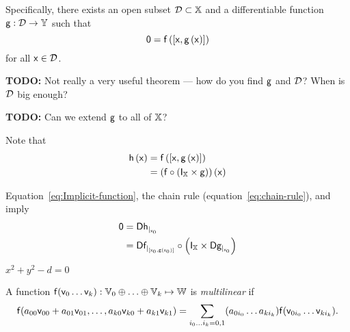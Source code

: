Specifically, 
there exists an open subset $\mathcal{D}  \subset \mathbb{X}$
and a differentiable function $\mathsf{g} : \mathcal{D} \rightarrow \mathbb{Y}$
such that 
\begin{equation}\label{eq:Implicit-function}
\mathsf{0} = \mathsf{f}\left( \left[ \mathsf{x} , \mathsf{g} \left( \mathsf{x} \right) \right] \right)
\end{equation}
for all 
$\mathsf{x} \in  \mathcal{D}$.

\textbf{TODO:} Not really a very useful theorem --- 
how do you find $\mathsf{g}$ and $\mathcal{D}$?
When is $\mathcal{D}$ big enough?

\textbf{TODO:} Can we extend $\mathsf{g}$ to all of $\mathbb{X}$?

Note that 
\begin{equation}\label{eq:Implicit-derivative}
\begin{aligned}
\mathsf{h}\left(\mathsf{x}\right) 
& = 
\mathsf{f}\left( \left[ \mathsf{x} , \mathsf{g} \left( \mathsf{x} \right) \right] \right)
\\
& =
\left( \mathsf{f} \circ \left( \mathsf{I}_{\mathbb{X}} \times \mathsf{g} \right) \right) 
\left( \mathsf{x} \right)
\end{aligned} 
\end{equation}

Equation~\ref{eq:Implicit-function}, the chain rule 
(equation~\ref{eq:chain-rule}),
and
 imply
\begin{equation}\label{eq:Implicit-derivative}
\begin{aligned}
\mathsf{0} & = {\mathsf{D}{\mathsf{h}}_{\mid_{\mathsf{x}_0}}}
\\
& = {\mathsf{D}{\mathsf{f}}_{\mid_{\left[ \mathsf{x}_0 , \mathsf{g}\left( \mathsf{x}_0 \right) \right]}}}
\circ \left( 
\mathsf{I}_{\mathbb{X}} 
\times 
{\mathsf{D}{\ensuremath{\mathsf{g}}}_{\mid_{\ensuremath{\mathsf{x}}_0 }}}
\right)
\end{aligned}
\end{equation}

\begin{example}[Circle]
$x^2 + y^2 - d = 0$
\end{example}

\label{sec:Derivatives-of-multilinear-functions}

A function
 $\mathsf{f}(\mathsf{v}_0 \ldots \mathsf{v}_k):\mathbb{V}_0 \oplus \ldots \oplus \mathbb{V}_k \mapsto \mathbb{W}$
is \textit{multilinear} if
\begin{equation}
\mathsf{f}(a_{00} \mathsf{v}_{00} + a_{01} \mathsf{v}_{01}, \ldots, a_{k0} \mathsf{v}_{k0} + a_{k1} \mathsf{v}_{k1})
 =  \sum_{i_0 \ldots i_k = 0,1} (a_{0i_0} \ldots a_{ki_k}) \mathsf{f}(\mathsf{v}_{0i_0} \ldots \mathsf{v}_{ki_k}).
\end{equation}

